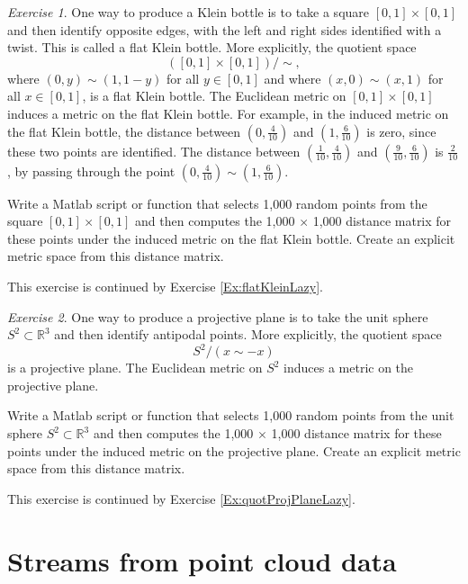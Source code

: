 \documentclass[amscd, amssymb, verbatim]{amsart}[12pt]
\theoremstyle{remark}
\newtheorem{exercise}{Exercise}
\theoremstyle{remark}
\theoremstyle{remark}
\begin{document}
\begin{exercise}\label{Ex:flatKlein}
One way to produce a Klein bottle is to take a square $[0, 1] \times [0, 1]$ and then identify opposite edges, with the left and right sides identified with a twist. This is called a flat Klein bottle. More explicitly, the quotient space 
$$([0, 1] \times [0, 1]) / \sim,$$
where $(0, y) \sim (1, 1 - y)$ for all $y \in [0, 1]$ and where $(x, 0) \sim (x, 1)$ for all $x \in [0, 1]$, is a flat Klein bottle. The Euclidean metric on $[0, 1] \times [0, 1]$ induces a metric on the flat Klein bottle. For example, in the induced metric on the flat Klein bottle, the distance between $(0, \frac{4}{10})$ and $(1, \frac{6}{10})$ is zero, since these two points are identified. The distance between $(\frac{1}{10}, \frac{4}{10})$ and $(\frac{9}{10}, \frac{6}{10})$ is $\frac{2}{10}$, by passing through the point $(0, \frac{4}{10}) \sim (1, \frac{6}{10})$.

Write a Matlab script or function that selects 1,000 random points from the square $[0, 1] \times [0, 1]$ and then computes the 1,000 $\times$ 1,000 distance matrix for these points under the induced metric on the flat Klein bottle. Create an explicit metric space from this distance matrix. 

This exercise is continued by Exercise \ref{Ex:flatKleinLazy}. 
\end{exercise}

\begin{exercise}\label{Ex:quotProjPlane}
One way to produce a projective plane is to take the unit sphere $S^2 \subset \mathbb{R}^3$ and then identify antipodal points. More explicitly, the quotient space 
$$S^2 / (x \sim -x)$$
is a projective plane. The Euclidean metric on $S^2$ induces a metric on the projective plane.

Write a Matlab script or function that selects 1,000 random points from the unit sphere $S^2 \subset \mathbb{R}^3$ and then computes the 1,000 $\times$ 1,000 distance matrix for these points under the induced metric on the projective plane. Create an explicit metric space from this distance matrix. 

This exercise is continued by Exercise \ref{Ex:quotProjPlaneLazy}. 
\end{exercise}




\section{Streams from point cloud data}\label{sfpc}
\end{document}
